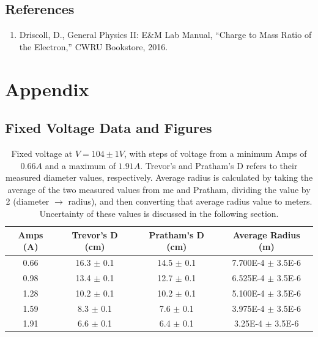 \documentclass[12pt]{article}
\begin{document}
\subsection{References}
\begin{enumerate}
    \item Driscoll, D., General Physics II: E$\&$M Lab Manual, “Charge to Mass Ratio of the Electron,” CWRU Bookstore, 2016.
    \label{ref:MANUEL}
\end{enumerate}

\clearpage
\appendix
\section{Appendix}
\subsection{Fixed Voltage Data and Figures}

\begin{table}[h]
    \centering
    \begin{tabular}{|c|c|c|c|}
        \hline
        Amps (A) & Trevor's D (cm) & Pratham's D (cm) & Average Radius (m) \\ 
        \hline
        0.66 & 16.3 $\pm$ 0.1 & 14.5 $\pm$ 0.1 & 7.700E-4 $\pm$ 3.5E-6 \\ 
        0.98 & 13.4 $\pm$ 0.1 & 12.7 $\pm$ 0.1 & 6.525E-4 $\pm$ 3.5E-6 \\ 
        1.28 & 10.2 $\pm$ 0.1 & 10.2 $\pm$ 0.1 & 5.100E-4 $\pm$ 3.5E-6 \\ 
        1.59 & 8.3 $\pm$ 0.1 & 7.6 $\pm$ 0.1 & 3.975E-4 $\pm$ 3.5E-6 \\
        1.91 & 6.6 $\pm$ 0.1 & 6.4 $\pm$ 0.1 & 3.25E-4 $\pm$ 3.5E-6 \\
        \hline
    \end{tabular}
    \caption{Fixed voltage at $V=104\pm1 V$, with steps of voltage from a minimum Amps of $0.66 A$ and a maximum of $1.91 A$. Trevor's and Pratham's D refers to their measured diameter values, respectively. Average radius is calculated by taking the average of the two measured values from me and Pratham, dividing the value by 2 (diameter $\to$ radius), and then converting that average radius value to meters. Uncertainty of these values is discussed in the following section.}
    \label{t:FixV}
\end{table}
\end{document}
